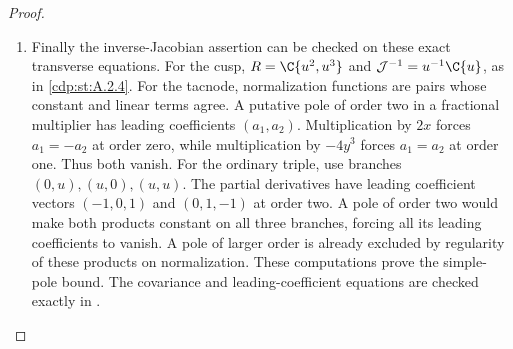 \begin{proof}
\begin{enumerate}[label={$\langle1\rangle$\arabic*.},leftmargin=*]
\item Finally the inverse-Jacobian assertion can be checked on these exact transverse equations. For the cusp, $R=\C\{u^2,u^3\}$ and $\mathcal J^{-1}=u^{-1}\C\{u\}$, as in \ref{cdp:st:A.2.4}. For the tacnode, normalization functions are pairs whose constant and linear terms agree. A putative pole of order two in a fractional multiplier has leading coefficients $(a_1,a_2)$. Multiplication by $2x$ forces $a_1=-a_2$ at order zero, while multiplication by $-4y^3$ forces $a_1=a_2$ at order one. Thus both vanish. For the ordinary triple, use branches $(0,u),(u,0),(u,u)$. The partial derivatives have leading coefficient vectors $(-1,0,1)$ and $(0,1,-1)$ at order two. A pole of order two would make both products constant on all three branches, forcing all its leading coefficients to vanish. A pole of larger order is already excluded by regularity of these products on normalization. These computations prove the simple-pole bound. The covariance and leading-coefficient equations are checked exactly in .

\end{enumerate}
\end{proof}
